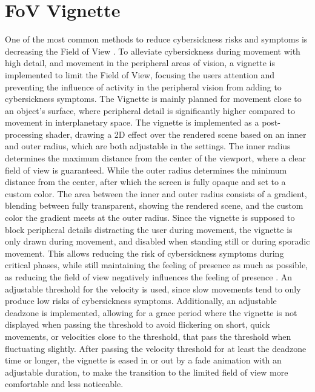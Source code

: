\chapter{FoV Vignette}

One of the most common methods to reduce cybersickness risks and symptoms is decreasing the Field of View \cite{Duh2001}
\cite{Lin2002}.
To alleviate cybersickness during movement with high detail, and movement in the peripheral areas of vision, a
vignette is implemented to limit the Field of View, focusing the users attention and preventing the influence of
activity in the peripheral vision from adding to cybersickness symptoms.
The Vignette is mainly planned for movement close to an object's surface, where peripheral detail is significantly
higher compared to movement in interplanetary space.
The vignette is implemented as a post-processing shader, drawing a 2D effect over the rendered scene based on an
inner and outer radius, which are both adjustable in the settings.
The inner radius determines the maximum distance from the center of the viewport, where a clear field of view is
guaranteed.
While the outer radius determines the minimum distance from the center, after which the screen is fully opaque and
set to a custom color.
The area between the inner and outer radius consists of a gradient, blending between fully transparent, showing the
rendered scene, and the custom color the gradient meets at the outer radius.
Since the vignette is supposed to block peripheral details distracting the user during movement, the vignette is only
drawn during movement, and disabled when standing still or during sporadic movement.
This allows reducing the risk of cybersickness symptoms during critical phases, while still maintaining the feeling
of presence as much as possible, as reducing the field of view negatively influences the feeling of presence \cite{Lin2002}.
An adjustable threshold for the velocity is used, since slow movements tend to only produce low risks of cybersickness
symptoms.
Additionally, an adjustable deadzone is implemented, allowing for a grace period where the vignette is not displayed
when passing the threshold to avoid flickering on short, quick movements, or velocities close to the threshold, that
pass the threshold when fluctuating slightly.
After passing the velocity threshold for at least the deadzone time or longer, the vignette is eased in or out by a
fade animation with an adjustable duration, to make the transition to the limited field of view more comfortable and
less noticeable.
